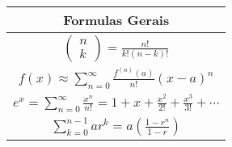 \documentclass{article}
\begin{document}
\begin{tabularx}{.5\textwidth}{c}
Formulas Gerais\\
\hline
$ 
\left( \begin{array}{c}
n\\
k
\end{array}
\right) = \frac{n!}{k!(n-k)!}$\\
$ f(x) \approx \displaystyle \sum_{n=0}^{\infty} \frac{f^{(n)}(a)}{n!}(x-a)^n $\\
$ e^{x} = \sum^{\infty}_{n=0} \frac{x^n}{n!} = 1 + x + \frac{x^2}{2!} + \frac{x^3}{3!} + \cdots $\\
$ \displaystyle \sum_{k=0}^{n-1} ar^k= a \left(\frac{1-r^{n}}{1-r}\right) $
\end{tabularx}
\end{document}
